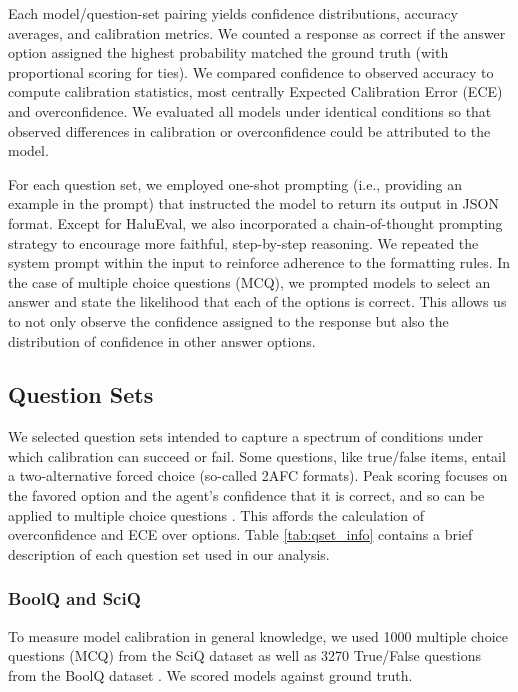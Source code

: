\documentclass{article}
\begin{document}
Each model/question-set pairing yields confidence distributions, accuracy averages, and calibration metrics. We counted a response as correct if the answer option assigned the highest probability matched the ground truth (with proportional scoring for ties). We compared confidence to observed accuracy to compute calibration statistics, most centrally Expected Calibration Error (ECE) \citep{Naeini_Cooper_Hauskrecht_2015} and overconfidence. We evaluated all models under identical conditions so that observed differences in calibration or overconfidence could be attributed to the model.

For each question set, we employed one-shot prompting (i.e., providing an example in the prompt) that instructed the model to return its output in JSON format. Except for HaluEval, we also incorporated a chain-of-thought prompting strategy to encourage more faithful, step-by-step reasoning. We repeated the system prompt within the input to reinforce adherence to the formatting rules. In the case of multiple choice questions (MCQ), we prompted models to select an answer and state the likelihood that each of the options is correct. This allows us to not only observe the confidence assigned to the response but also the distribution of confidence in other answer options.


\subsection{Question Sets}
We selected question sets intended to capture a spectrum of conditions under which calibration can succeed or fail. Some questions, like true/false items, entail a two-alternative forced choice (so-called 2AFC formats). Peak scoring focuses on the favored option and the agent's confidence that it is correct, and so can be applied to multiple choice questions \citep{Moore_Tenney_Haran_2015,Keren_1988}. This affords the calculation of overconfidence and ECE over options. Table \ref{tab:qset_info} contains a brief description of each question set used in our analysis.


\subsubsection{BoolQ and SciQ}
To measure model calibration in general knowledge, we used 1000 multiple choice questions (MCQ) from the SciQ dataset \citep{SciQ} as well as 3270 True/False questions from the BoolQ dataset \citep{clark2019boolqexploringsurprisingdifficulty}. We scored models against ground truth. 
\end{document}
